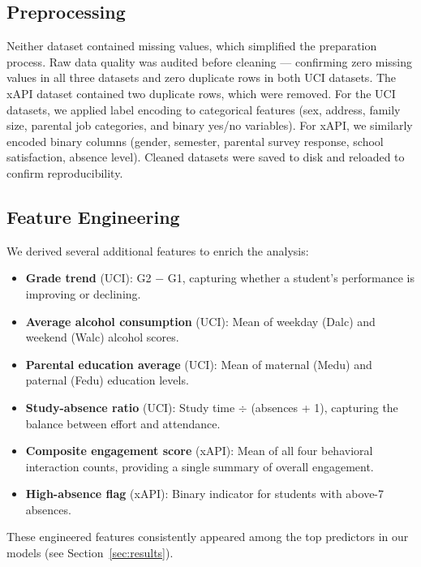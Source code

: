 \documentclass[conference]{IEEEtran}
\begin{document}
\subsection{Preprocessing}

Neither dataset contained missing values, which simplified the preparation process. Raw data quality was audited before cleaning — confirming zero missing values in all three datasets and zero duplicate rows in both UCI datasets. The xAPI dataset contained two duplicate rows, which were removed. For the UCI datasets, we applied label encoding to categorical features (sex, address, family size, parental job categories, and binary yes/no variables). For xAPI, we similarly encoded binary columns (gender, semester, parental survey response, school satisfaction, absence level). Cleaned datasets were saved to disk and reloaded to confirm reproducibility.

\subsection{Feature Engineering}

We derived several additional features to enrich the analysis:

\begin{itemize}
  \item \textbf{Grade trend} (UCI): G2 $-$ G1, capturing whether a student's performance is improving or declining.
  \item \textbf{Average alcohol consumption} (UCI): Mean of weekday (Dalc) and weekend (Walc) alcohol scores.
  \item \textbf{Parental education average} (UCI): Mean of maternal (Medu) and paternal (Fedu) education levels.
  \item \textbf{Study-absence ratio} (UCI): Study time $\div$ (absences + 1), capturing the balance between effort and attendance.
  \item \textbf{Composite engagement score} (xAPI): Mean of all four behavioral interaction counts, providing a single summary of overall engagement.
  \item \textbf{High-absence flag} (xAPI): Binary indicator for students with above-7 absences.
\end{itemize}

These engineered features consistently appeared among the top predictors in our models (see Section~\ref{sec:results}).

\end{document}
